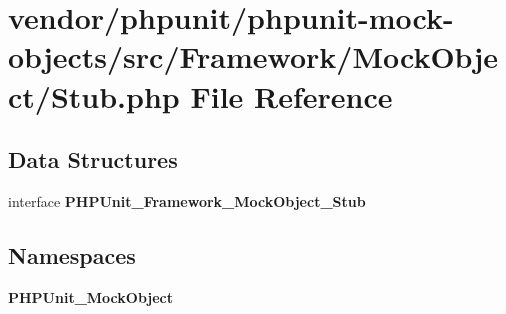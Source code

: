 \section{vendor/phpunit/phpunit-\/mock-\/objects/src/\+Framework/\+Mock\+Object/\+Stub.php File Reference}
\label{phpunit_2phpunit-mock-objects_2src_2_framework_2_mock_object_2_stub_8php}
\subsection*{Data Structures}
\begin{DoxyCompactItemize}
\item 
interface {\bf P\+H\+P\+Unit\+\_\+\+Framework\+\_\+\+Mock\+Object\+\_\+\+Stub}
\end{DoxyCompactItemize}
\subsection*{Namespaces}
\begin{DoxyCompactItemize}
\item 
 {\bf P\+H\+P\+Unit\+\_\+\+Mock\+Object}
\end{DoxyCompactItemize}
